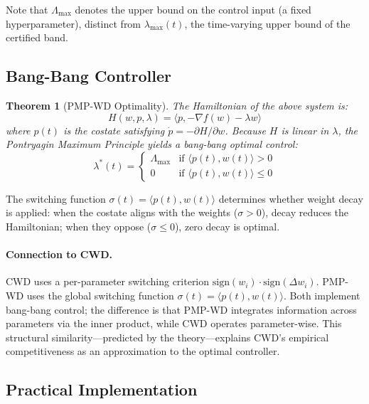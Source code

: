 \documentclass{article}
\newtheorem{theorem}{Theorem}
\begin{document}
Note that $\Lambda_{\max}$ denotes the upper bound on the control input (a fixed hyperparameter), distinct from $\lambda_{\max}(t)$, the time-varying upper bound of the certified band.

\subsection{Bang-Bang Controller}

\begin{theorem}[PMP-WD Optimality]
\label{thm:pmpwd}
The Hamiltonian of the above system is:
\begin{equation}
H(w, p, \lambda) = \langle p, -\nabla f(w) - \lambda w \rangle
\label{eq:hamiltonian}
\end{equation}
where $p(t)$ is the costate satisfying $\dot{p} = -\partial H / \partial w$. Because $H$ is linear in $\lambda$, the Pontryagin Maximum Principle yields a bang-bang optimal control:
\begin{equation}
\lambda^*(t) = \begin{cases} \Lambda_{\max} & \text{if } \langle p(t), w(t) \rangle > 0 \\ 0 & \text{if } \langle p(t), w(t) \rangle \leq 0 \end{cases}
\label{eq:bangbang}
\end{equation}
\end{theorem}

The switching function $\sigma(t) = \langle p(t), w(t) \rangle$ determines whether weight decay is applied: when the costate aligns with the weights ($\sigma > 0$), decay reduces the Hamiltonian; when they oppose ($\sigma \leq 0$), zero decay is optimal.

\paragraph{Connection to CWD.} CWD uses a per-parameter switching criterion $\text{sign}(w_i) \cdot \text{sign}(\Delta w_i)$. PMP-WD uses the global switching function $\sigma(t) = \langle p(t), w(t) \rangle$. Both implement bang-bang control; the difference is that PMP-WD integrates information across parameters via the inner product, while CWD operates parameter-wise. This structural similarity---predicted by the theory---explains CWD's empirical competitiveness as an approximation to the optimal controller.

\subsection{Practical Implementation}
\end{document}
